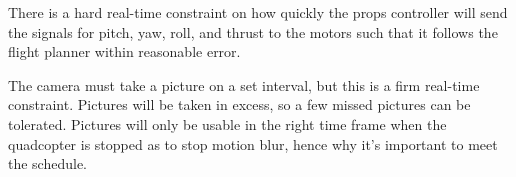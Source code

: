 \documentclass[10pt,letterpaper]{article}
\begin{document}
   There is a hard real-time constraint on how quickly the props controller will send the signals for pitch, yaw, roll, and thrust to the motors such that it follows the flight planner within reasonable error.

The camera must take a picture on a set interval, but this is a firm real-time constraint. Pictures will be taken in excess, so a few missed pictures can be tolerated. Pictures will only be usable in the right time frame when the quadcopter is stopped as to stop motion blur, hence why it's important to meet the schedule.
\end{document}
